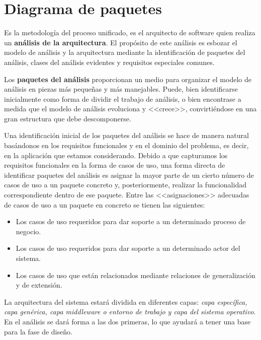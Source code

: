 	\section{Diagrama de paquetes} %
		\label{sec:diagrama_de_paquetes_analisis}
		
		Es la metodología del proceso unificado, es el arquitecto de software quien realiza un {\bf análisis de la arquitectura}. El propósito de este análisis es esbozar el modelo de análisis y la arquitectura mediante la identificación de paquetes del análisis, clases del análisis evidentes y requisitos especiales comunes.
		
		Los {\bf paquetes del análisis} proporcionan un medio para organizar el modelo de análisis en piezas más pequeñas y más manejables. Puede, bien identificarse inicialmente como forma de dividir el trabajo de análisis, o bien encontrase a medida que el modelo de análisis evoluciona y <<crece>>, convirtiéndose en una gran estructura que debe descomponerse.
		
		Una identificación inicial de los paquetes del análisis se hace de manera natural basándonos en los requisitos funcionales y en el dominio del problema, es decir, en la aplicación que estamos considerando. Debido a que capturamos los requisitos funcionales en la forma de casos de uso, una forma directa de identificar paquetes del análisis es asignar la mayor parte de un cierto número de casos de uso a un paquete concreto y, posteriormente, realizar la funcionalidad correspondiente dentro de ese paquete. Entre las <<asignaciones>> adecuadas de casos de uso a un paquete en concreto se tienen las siguientes:
		\begin{itemize}
			\item Los casos de uso requeridos para dar soporte a un determinado proceso de negocio.
			\item Los casos de uso requeridos para dar soporte a un determinado actor del sistema.
			\item Los casos de uso que están relacionados mediante relaciones de generalización y de extensión.
		\end{itemize}
		
		La arquitectura del sistema estará dividida en diferentes capas: {\it capa específica, capa genérica, capa middleware o entorno de trabajo y capa del sistema operativo}. En el análisis se dará forma a las dos primeras, lo que ayudará a tener una base para la fase de diseño.
		
